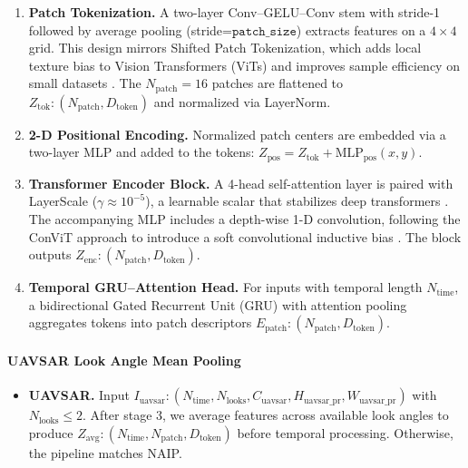 \documentclass[remotesensing,article,submit,pdftex,moreauthors]{Definitions/mdpi}
\begin{document}
\begin{enumerate}[leftmargin=*]      
\item \textbf{Patch Tokenization.}  
      A two-layer Conv–GELU–Conv stem with stride-1 followed by average pooling (stride=$\texttt{patch\_size}$) extracts features on a $4\times4$ grid.  
      This design mirrors Shifted Patch Tokenization, which adds local texture bias to Vision Transformers (ViTs) and improves sample efficiency on small datasets \cite{lee2021vision}.  
      The $N_{\text{patch}}=16$ patches are flattened to $Z_{\text{tok}}: (N_{\text{patch}}, D_{\text{token}})$ and normalized via LayerNorm.


\item \textbf{2-D Positional Encoding.}  
      Normalized patch centers are embedded via a two-layer MLP and added to the tokens:  
      $Z_{\text{pos}} = Z_{\text{tok}} + \text{MLP}_{\text{pos}}(x,y)$.

\item \textbf{Transformer Encoder Block.}  
      A 4-head self-attention layer is paired with LayerScale ($\gamma \approx 10^{-5}$), a learnable scalar that stabilizes deep transformers \cite{touvron2021going}.  
      The accompanying MLP includes a depth-wise 1-D convolution, following the ConViT approach to introduce a soft convolutional inductive bias \cite{dascoli2021convit}.  
      The block outputs $Z_{\text{enc}}: (N_{\text{patch}}, D_{\text{token}})$.


\item \textbf{Temporal GRU–Attention Head.}  
      For inputs with temporal length $N_{\text{time}}$, a bidirectional Gated Recurrent Unit (GRU) with attention pooling aggregates tokens into patch descriptors $E_{\text{patch}}: (N_{\text{patch}}, D_{\text{token}})$.
\end{enumerate}

\paragraph{UAVSAR Look Angle Mean Pooling}
\begin{itemize}[leftmargin=*]
\item \textbf{UAVSAR.}  
      Input $I_{\text{uavsar}}: (N_{\text{time}}, N_{\text{looks}}, C_{\text{uavsar}}, H_{\text{uavsar\_pr}}, W_{\text{uavsar\_pr}})$ with $N_{\text{looks}} \leq 2$.  
      After stage 3, we average features across available look angles to produce $Z_{\text{avg}}: (N_{\text{time}}, N_{\text{patch}}, D_{\text{token}})$ before temporal processing.
      Otherwise, the pipeline matches NAIP.
\end{itemize}
\end{document}
